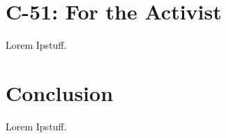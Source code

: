 \documentclass[a4paper, 11pt]{article} %
\begin{document}
\section*{C-51: For the Activist}
Lorem Ipstuff.


\section*{Conclusion}
Lorem Ipstuff.







\end{document}
